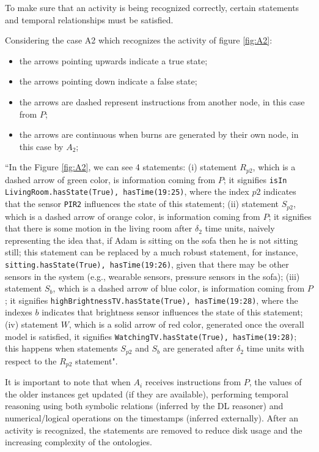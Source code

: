\documentclass{thesisreport}
\begin{document}
 To make sure that an activity is being recognized correctly, certain statements and temporal relationships must be satisfied.
 
 Considering the case A2 which recognizes the activity of figure \ref{fig:A2}:
 \begin{itemize}
     \item the arrows pointing upwards indicate a true state;
     \item the arrows pointing down indicate a false state;
     \item the arrows are dashed represent instructions from another node, in this case from $P$;
     \item the arrows are continuous when burns are generated by their own node, in this case by $A_2$;
 \end{itemize}
 
 ``In the Figure \ref{fig:A2}, we can see 4 statements: (i) statement $R_{p2}$, which is a dashed arrow of green color, is information coming from $P$; it signifies \texttt{isIn LivingRoom.{hasState(True), hasTime(19:25)}}, where the index $p2$ indicates that the sensor \texttt{PIR2} influences the state of this statement; (ii) statement $S_{p2}$, which is a dashed arrow of orange color, is information coming from $P$; it signifies that there is some motion in the living room after $\delta_2$ time units, naively representing the idea that, if Adam is sitting on the sofa then he is not sitting still; this statement can be replaced by a much robust statement, for instance, \texttt{sitting.{hasState(True), hasTime(19:26)}}, given that there may be other sensors in the system (e.g., wearable sensors, pressure sensors in the sofa); (iii) statement $S_b$, which is a dashed arrow of blue color, is information coming from $P$; it signifies \texttt{highBrightnessTV.{hasState(True), hasTime(19:28)}}, where the indexes $b$ indicates that brightness sensor influences the state of this statement; (iv) statement $W$, which is a solid arrow of red color, generated once the overall model is satisfied, it signifies \texttt{WatchingTV.{hasState(True), hasTime(19:28)}}; this happens when statements $S_{p2}$ and $S_b$ are generated after $\delta_2$ time units with respect to the $R_{p2}$ statement".
 

 It is important to note that when $A_i$ receives instructions from $P$, the values of the older instances get updated (if they are available), performing temporal reasoning using both symbolic relations (inferred by the DL reasoner) and numerical/logical operations on the timestamps (inferred externally). 
 After an activity is recognized, the statements are removed to reduce disk usage and the increasing complexity of the ontologies. 
 
\end{document}
